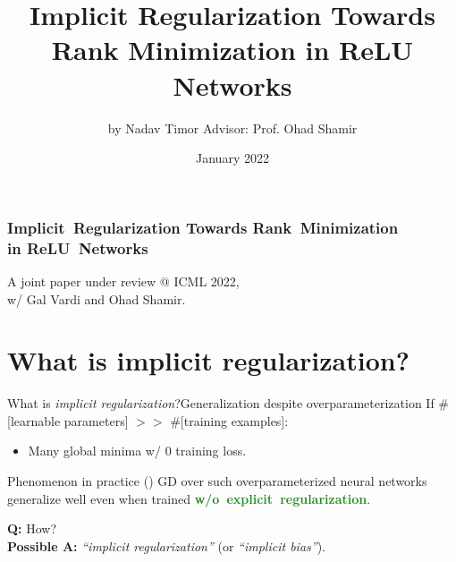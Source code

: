 \documentclass[handout,usenames,dvipsnames]{beamer} %
\title[Implicit Reg.: Rank Min. in ReLU Networks]{Implicit Regularization Towards Rank Minimization in ReLU Networks}
\author[Nadav Timor]{
    by Nadav Timor\newline
    Advisor: Prof. Ohad Shamir
}
\institute[Weizmann Institute]{Weizmann Institute of Science}
\date[January 2022]{January 2022}
\newcommand{\true}[1]{{\textcolor{ForestGreen}{\textbf{#1}}}}
\begin{document}
\frame{\titlepage}

\begin{frame}
    \frametitle{Implicit~Regularization Towards Rank~Minimization\\in ReLU~Networks}
    A joint paper under review @ ICML 2022,\\
    w/ Gal Vardi and Ohad Shamir.
\end{frame}



\section{What is implicit regularization?}

\begin{frame}{What is \emph{implicit regularization}?}{Generalization despite overparameterization}
    \pause
    \newline
    If \#[learnable parameters] $>>$ \#[training examples]:
    \pause
    \begin{itemize}
        \item \alert{Many} global minima w/ $0$ training loss.
        \pause
    \end{itemize}
    \pause
    \begin{block}{Phenomenon in practice (\cite{zhang2017understanding})}
        GD over such overparameterized neural networks generalize well even when trained \true{w/o~explicit~regularization}.
    \end{block}
    \textbf{Q:} How?\\
    \pause
    \textbf{Possible A:} \emph{``implicit regularization''} (or \emph{``implicit bias''}).
    
\end{frame}
\end{document}
